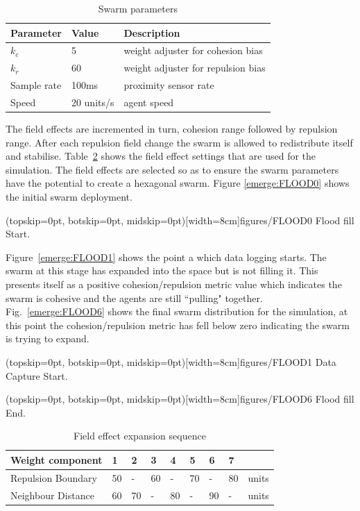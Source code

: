 \documentclass{ieeeaccess}
\begin{document}
\begin{table}[H]
\begin{center}
\begin{tabular}{| p{1.8cm} | p{1.5cm} | p{4.0cm} |}
\hline
\bf Parameter & \bf Value  & \bf Description \\ \hline
$k_c$         & 5          & weight adjuster for cohesion bias\\ \hline
$k_r$         & 60         & weight adjuster for repulsion bias\\ \hline
Sample rate   & 100ms      & proximity sensor rate\\ \hline
Speed         & 20 units/s & agent speed\\ \hline
\end{tabular}\caption{Swarm parameters} \label{tab:FillParameters1}
\end{center}
\end{table}

The field effects are incremented in turn, cohesion range followed by repulsion
range. After each repulsion field change the swarm is allowed to redistribute
itself and stabilise. Table~\ref{tab:FillSequence} shows the field effect
settings that are used for the simulation. The field effects are selected so as
to ensure the swarm parameters have the potential to create a hexagonal swarm.
Figure \ref{emerge:FLOOD0} shows the initial swarm deployment.

\Figure[t!](topskip=0pt, botskip=0pt, midskip=0pt)[width=8cm]{figures/FLOOD0}
{Flood fill Start.\label{emerge:FLOOD0}}

Figure~\ref{emerge:FLOOD1} shows the point a which data logging starts. The
swarm at this stage has expanded into the space but is not filling it. This
presents itself as a positive cohesion/repulsion metric value which indicates
the swarm is cohesive and the agents are still ``pulling" together.
Fig.~\ref{emerge:FLOOD6} shows the final swarm distribution for the simulation,
at this point the cohesion/repulsion metric has fell below zero indicating the
swarm is trying to expand. 

\Figure[t!](topskip=0pt, botskip=0pt, midskip=0pt)[width=8cm]{figures/FLOOD1}
{Data Capture Start.\label{emerge:FLOOD1}}

\Figure[t!](topskip=0pt, botskip=0pt, midskip=0pt)[width=8cm]{figures/FLOOD6}
{Flood fill End.\label{emerge:FLOOD6}}

\begin{table}[H]
\begin{center}
\begin{tabular}{| p{1.8cm} | p{0.3cm} | p{0.3cm} | p{0.3cm} | p{0.3cm} | p{0.3cm} | p{0.3cm} | p{0.3cm} | p{0.7cm} |}
\hline
\bf Weight \bf component & \bf 1 & \bf 2 & \bf 3 & \bf 4 & \bf 5 & \bf 6 & \bf 7 & \\ \hline
Repulsion Boundary & 50 & -  & 60 & -  & 70 & -  & 80 & units\\  \hline
Neighbour Distance & 60 & 70 & -  & 80 & -  & 90 & -  & units\\  \hline
\end{tabular}\caption{Field effect expansion sequence} \label{tab:FillSequence}
\end{center}
\end{table}
\end{document}
